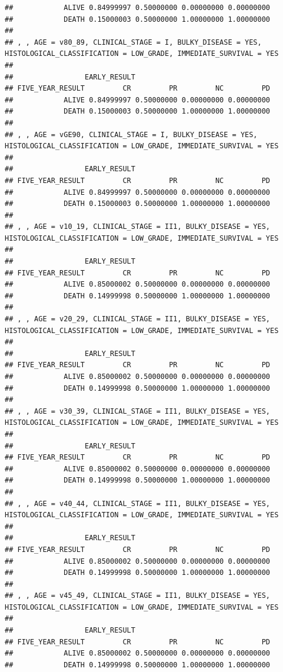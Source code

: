 \documentclass[]{article}
\begin{document}
\begin{verbatim}
##            ALIVE 0.84999997 0.50000000 0.00000000 0.00000000
##            DEATH 0.15000003 0.50000000 1.00000000 1.00000000
## 
## , , AGE = v80_89, CLINICAL_STAGE = I, BULKY_DISEASE = YES, HISTOLOGICAL_CLASSIFICATION = LOW_GRADE, IMMEDIATE_SURVIVAL = YES
## 
##                 EARLY_RESULT
## FIVE_YEAR_RESULT         CR         PR         NC         PD
##            ALIVE 0.84999997 0.50000000 0.00000000 0.00000000
##            DEATH 0.15000003 0.50000000 1.00000000 1.00000000
## 
## , , AGE = vGE90, CLINICAL_STAGE = I, BULKY_DISEASE = YES, HISTOLOGICAL_CLASSIFICATION = LOW_GRADE, IMMEDIATE_SURVIVAL = YES
## 
##                 EARLY_RESULT
## FIVE_YEAR_RESULT         CR         PR         NC         PD
##            ALIVE 0.84999997 0.50000000 0.00000000 0.00000000
##            DEATH 0.15000003 0.50000000 1.00000000 1.00000000
## 
## , , AGE = v10_19, CLINICAL_STAGE = II1, BULKY_DISEASE = YES, HISTOLOGICAL_CLASSIFICATION = LOW_GRADE, IMMEDIATE_SURVIVAL = YES
## 
##                 EARLY_RESULT
## FIVE_YEAR_RESULT         CR         PR         NC         PD
##            ALIVE 0.85000002 0.50000000 0.00000000 0.00000000
##            DEATH 0.14999998 0.50000000 1.00000000 1.00000000
## 
## , , AGE = v20_29, CLINICAL_STAGE = II1, BULKY_DISEASE = YES, HISTOLOGICAL_CLASSIFICATION = LOW_GRADE, IMMEDIATE_SURVIVAL = YES
## 
##                 EARLY_RESULT
## FIVE_YEAR_RESULT         CR         PR         NC         PD
##            ALIVE 0.85000002 0.50000000 0.00000000 0.00000000
##            DEATH 0.14999998 0.50000000 1.00000000 1.00000000
## 
## , , AGE = v30_39, CLINICAL_STAGE = II1, BULKY_DISEASE = YES, HISTOLOGICAL_CLASSIFICATION = LOW_GRADE, IMMEDIATE_SURVIVAL = YES
## 
##                 EARLY_RESULT
## FIVE_YEAR_RESULT         CR         PR         NC         PD
##            ALIVE 0.85000002 0.50000000 0.00000000 0.00000000
##            DEATH 0.14999998 0.50000000 1.00000000 1.00000000
## 
## , , AGE = v40_44, CLINICAL_STAGE = II1, BULKY_DISEASE = YES, HISTOLOGICAL_CLASSIFICATION = LOW_GRADE, IMMEDIATE_SURVIVAL = YES
## 
##                 EARLY_RESULT
## FIVE_YEAR_RESULT         CR         PR         NC         PD
##            ALIVE 0.85000002 0.50000000 0.00000000 0.00000000
##            DEATH 0.14999998 0.50000000 1.00000000 1.00000000
## 
## , , AGE = v45_49, CLINICAL_STAGE = II1, BULKY_DISEASE = YES, HISTOLOGICAL_CLASSIFICATION = LOW_GRADE, IMMEDIATE_SURVIVAL = YES
## 
##                 EARLY_RESULT
## FIVE_YEAR_RESULT         CR         PR         NC         PD
##            ALIVE 0.85000002 0.50000000 0.00000000 0.00000000
##            DEATH 0.14999998 0.50000000 1.00000000 1.00000000

\end{verbatim}
\end{document}
